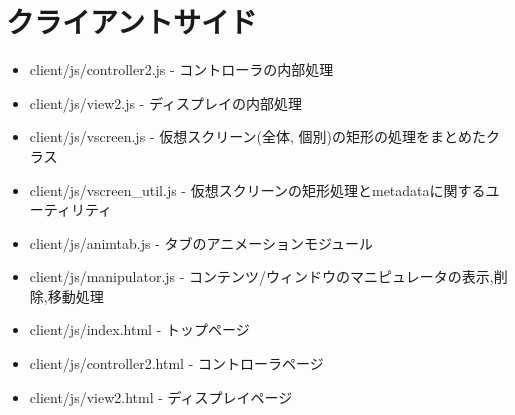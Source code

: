 \documentclass[a4paper,10pt,oneside]{jsbook}
\begin{document}
\section{クライアントサイド}
\begin{itemize}
\item client/js/controller2.js - コントローラの内部処理
\item client/js/view2.js - ディスプレイの内部処理
\item client/js/vscreen.js - 仮想スクリーン(全体, 個別)の矩形の処理をまとめたクラス
\item client/js/vscreen\_util.js - 仮想スクリーンの矩形処理とmetadataに関するユーティリティ
\item client/js/animtab.js - タブのアニメーションモジュール
\item client/js/manipulator.js - コンテンツ/ウィンドウのマニピュレータの表示,削除,移動処理
\item client/js/index.html - トップページ
\item client/js/controller2.html - コントローラページ
\item client/js/view2.html - ディスプレイページ
\end{itemize}
\end{document}

